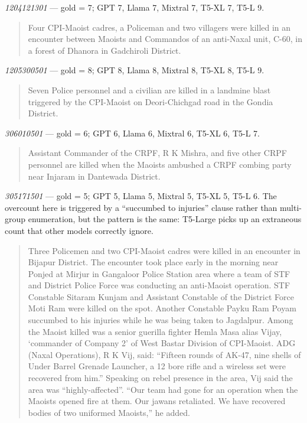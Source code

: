 \documentclass[
  11pt,
]{article}
\begin{document}
\smallskip\noindent \emph{1204121301} --- gold = 7; GPT 7, Llama 7,
Mixtral 7, T5-XL 7, T5-L 9.

\begin{quote}
Four CPI-Maoist cadres, a Policeman and two villagers were killed in an
encounter between Maoists and Commandos of an anti-Naxal unit, C-60, in
a forest of Dhanora in Gadchiroli District.
\end{quote}

\noindent \emph{1205300501} --- gold = 8; GPT 8, Llama 8, Mixtral 8,
T5-XL 8, T5-L 9.

\begin{quote}
Seven Police personnel and a civilian are killed in a landmine blast
triggered by the CPI-Maoist on Deori-Chichgad road in the Gondia
District.
\end{quote}

\noindent \emph{306010501} --- gold = 6; GPT 6, Llama 6, Mixtral 6,
T5-XL 6, T5-L 7.

\begin{quote}
Assistant Commander of the CRPF, R K Mishra, and five other CRPF
personnel are killed when the Maoists ambushed a CRPF combing party near
Injaram in Dantewada District.
\end{quote}

\noindent \emph{305171501} --- gold = 5; GPT 5, Llama 5, Mixtral 5,
T5-XL 5, T5-L 6. The overcount here is triggered by a ``succumbed to
injuries'' clause rather than multi-group enumeration, but the pattern
is the same: T5-Large picks up an extraneous count that other models
correctly ignore.

\begin{quote}
Three Policemen and two CPI-Maoist cadres were killed in an encounter in
Bijapur District. The encounter took place early in the morning near
Ponjed at Mirjur in Gangaloor Police Station area where a team of STF
and District Police Force was conducting an anti-Maoist operation. STF
Constable Sitaram Kunjam and Assistant Constable of the District Force
Moti Ram were killed on the spot. Another Constable Payku Ram Poyam
succumbed to his injuries while he was being taken to Jagdalpur. Among
the Maoist killed was a senior guerilla fighter Hemla Masa alias Vijay,
`commander of Company 2' of West Bastar Division of CPI-Maoist. ADG
(Naxal Operations), R K Vij, said: ``Fifteen rounds of AK-47, nine
shells of Under Barrel Grenade Launcher, a 12 bore rifle and a wireless
set were recovered from him.'' Speaking on rebel presence in the area,
Vij said the area was ``highly-affected''. ``Our team had gone for an
operation when the Maoists opened fire at them. Our jawans retaliated.
We have recovered bodies of two uniformed Maoists,'' he added.
\end{quote}
\end{document}
